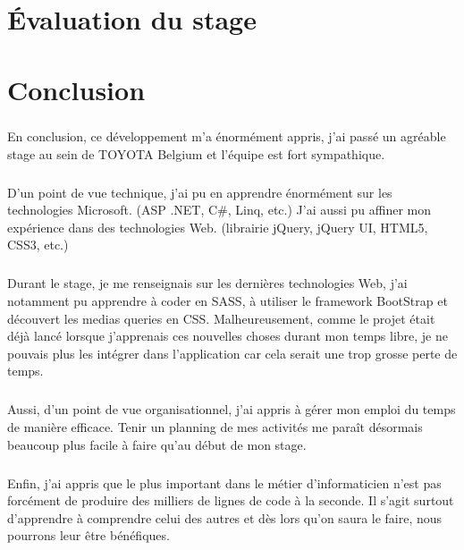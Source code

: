 \documentclass[12pt]{report}
\begin{document}
\chapter{Évaluation du stage}

\chapter{Conclusion}
\paragraph{}
En conclusion, ce développement m'a énormément appris, j'ai passé un agréable stage au sein de TOYOTA Belgium et l'équipe est fort sympathique.
\paragraph{}
D'un point de vue technique, j'ai pu en apprendre énormément sur les technologies Microsoft. (ASP .NET, C\#, Linq, etc.) J'ai aussi pu affiner mon expérience dans des technologies Web. (librairie jQuery, jQuery UI, HTML5, CSS3, etc.)
\paragraph{}
Durant le stage, je me renseignais sur les dernières technologies Web, j'ai notamment pu apprendre à coder en SASS, à utiliser le framework BootStrap et découvert les medias queries en CSS. Malheureusement, comme le projet était déjà lancé lorsque j'apprenais ces nouvelles choses durant mon temps libre, je ne pouvais plus les intégrer dans l'application car cela serait une trop grosse perte de temps.

\paragraph{}
Aussi, d'un point de vue organisationnel, j'ai appris à gérer mon emploi du temps de manière efficace. Tenir un planning de mes activités me paraît désormais beaucoup plus facile à faire qu'au début de mon stage. 

\paragraph{}
Enfin, j'ai appris que le plus important dans le métier d'informaticien n'est pas forcément de produire des milliers de lignes de code à la seconde. 
Il s'agit surtout d'apprendre à comprendre celui des autres et dès lors qu'on saura le faire, nous pourrons leur être bénéfiques.

\nocite{*}
\printbibliography
\end{document}
